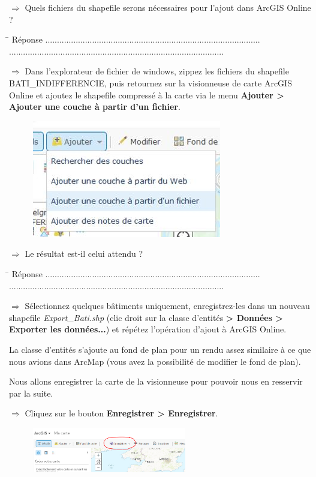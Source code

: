 \documentclass[11pt]{article}
\newcommand{\action}{$\Rightarrow$ }
\newcommand{\reponse}{
	\begin{tabbing}
	\hspace{2cm}\=\kill
	Réponse \> ............................................................................................ \\
 	\> ............................................................................................
	\end{tabbing}
}
\begin{document}
\action Quels fichiers du shapefile serons nécessaires pour l'ajout dans ArcGIS Online ?

\reponse

\action Dans l'explorateur de fichier de windows, zippez les fichiers du shapefile BATI\_INDIFFERENCIE, puis retournez sur la visionneuse de carte ArcGIS Online et ajoutez le shapefile compressé à la carte via le menu \textbf{Ajouter > Ajouter une couche à partir d'un fichier}.
\begin{figure}[H]
	\center \includegraphics{img/cours3/ago_ajout_couche.jpg} \\
\end{figure}

\action Le résultat est-il celui attendu ?

\reponse

\action Sélectionnez quelques bâtiments uniquement, enregistrez-les dans un nouveau shapefile \textit{Export\_Bati.shp} (clic droit sur la classe d'entités \textbf{> Données > Exporter les données...}) et répétez l'opération d'ajout à ArcGIS Online.

La classe d'entités s'ajoute au fond de plan pour un rendu assez similaire à ce que nous avions dans ArcMap (vous avez la possibilité de modifier le fond de plan).

Nous allons enregistrer la carte de la visionneuse pour pouvoir nous en resservir par la suite.

\action Cliquez sur le bouton \textbf{Enregistrer > Enregistrer}.
\begin{figure}[H]
	\center \includegraphics[width=0.6\textwidth]{img/cours3/ago_enregistrer_carte.png} \\
\end{figure}
\end{document}
